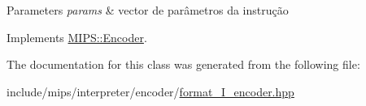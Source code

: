 \begin{DoxyParams}{Parameters}
{\em params} & vector de parâmetros da instrução \\
\hline
\end{DoxyParams}


Implements \hyperlink{classMIPS_1_1Encoder_a4a29c42d601460be8e8d353d8fc0da34}{M\+I\+P\+S\+::\+Encoder}.



The documentation for this class was generated from the following file\+:\begin{DoxyCompactItemize}
\item 
include/mips/interpreter/encoder/\hyperlink{format__I__encoder_8hpp}{format\+\_\+\+I\+\_\+encoder.\+hpp}\end{DoxyCompactItemize}
